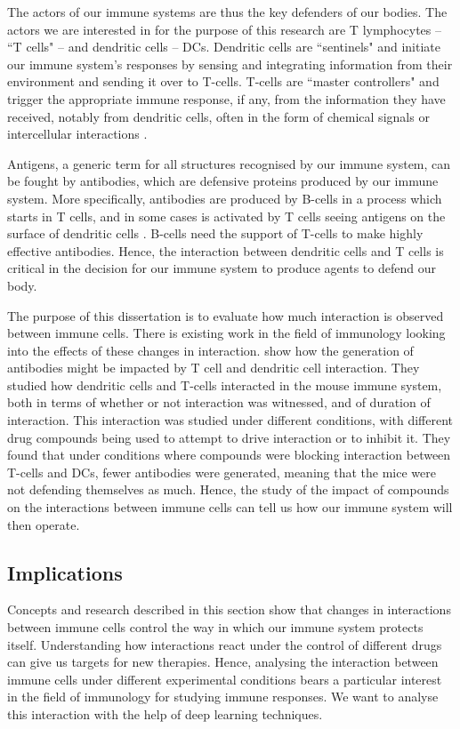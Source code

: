 The actors of our immune systems are thus the key defenders of our bodies. The actors we are interested in for the purpose of this research are T lymphocytes – ``T cells" – and dendritic cells – DCs. Dendritic cells are ``sentinels" and initiate our immune system's responses by sensing and integrating information from their environment and sending it over to T-cells. T-cells are ``master controllers" and trigger the appropriate immune response, if any, from the information they have received, notably from dendritic cells, often in the form of chemical signals or intercellular interactions \citep{Rogh20, Brewster15}.

Antigens, a generic term for all structures recognised by our immune system, can be fought by antibodies, which are defensive proteins produced by our immune system. More specifically, antibodies are produced by B-cells in a process which starts in T cells, and in some cases is activated by T cells seeing antigens on the surface of dendritic cells \citep{benson_antigen_2015}. B-cells need the support of T-cells to make highly effective antibodies. Hence, the interaction between dendritic cells and T cells is critical in the decision for our immune system to produce agents to defend our body.

The purpose of this dissertation is to evaluate how much interaction is observed between immune cells. There is existing work in the field of immunology looking into the effects of these changes in interaction. \citet{benson_antigen_2015} show how the generation of antibodies might be impacted by T cell and dendritic cell interaction. They studied how dendritic cells and T-cells interacted in the mouse immune system, both in terms of whether or not interaction was witnessed, and of duration of interaction. This interaction was studied under different conditions, with different drug compounds being used to attempt to drive interaction or to inhibit it. They found that under conditions where compounds were blocking interaction between T-cells and DCs, fewer antibodies were generated, meaning that the mice were not defending themselves as much. Hence, the study of the impact of compounds on the interactions between immune cells can tell us how our immune system will then operate.

\subsection{Implications}

Concepts and research described in this section show that changes in interactions between immune cells control the way in which our immune system protects itself. Understanding how interactions react under the control of different drugs can give us targets for new therapies. Hence, analysing the interaction between immune cells under different experimental conditions bears a particular interest in the field of immunology for studying immune responses. We want to analyse this interaction with the help of deep learning techniques.

